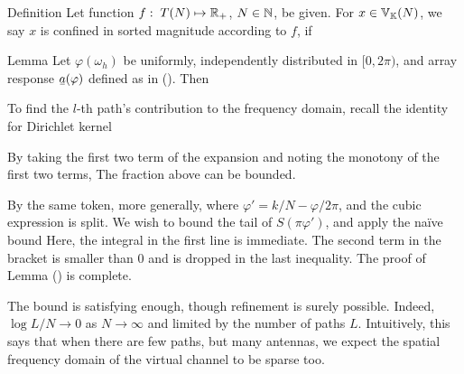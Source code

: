 \Result
{Definition}
{
Let function \(f:\; T (N) \mapsto \mathbb{R}_+\), \(N \in \mathbb{N}\), be given.
For \(x \in \mathbb{V}_{\mathbb{K}}(N)\), we say \(x\) is confined in sorted magnitude according to \(f\), if
}

\Result
{Lemma}
{
Let \(\varphi (\omega_h)\) be uniformly, independently distributed in \([0,2\pi)\), and array response \(\V{a} (\varphi)\) defined as in ().
Then
%
%
}

To find the \(l\)-th path's contribution to the frequency domain, recall the identity for Dirichlet kernel
%
%

By taking the first two term of the expansion
%
%
and noting the monotony of the first two terms,
%
%
The fraction above can be bounded.

By the same token, more generally,
%
%
where \(\varphi' =k/N -\varphi/2\pi\), and the cubic expression is split.
We wish to bound the tail of \(S (\pi \varphi')\), and apply the na\"ive bound
%
%
Here, the integral in the first line is immediate.
The second term in the bracket is smaller than 0 and is dropped in the last inequality.
The proof of Lemma () is complete.

The bound is satisfying enough, though refinement is surely possible.
Indeed, \(\log L/N \to 0\) as \(N \to \infty\) and limited by the number of paths \(L\).
Intuitively, this says that when there are few paths, but many antennas, we expect the spatial frequency domain of the virtual channel to be sparse too.

